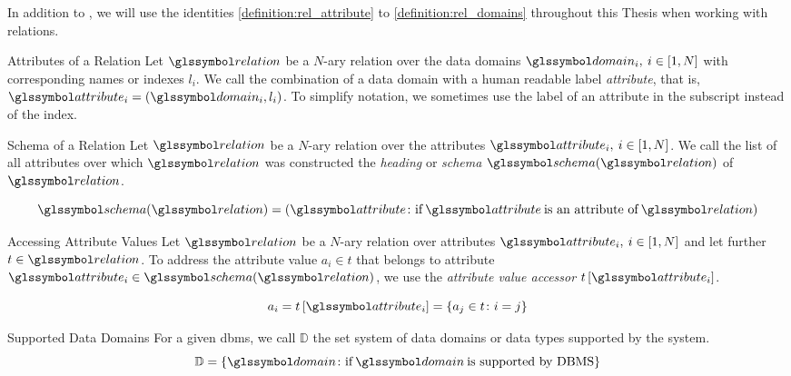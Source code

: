 In addition to , we will use the identities \ref{definition:rel_attribute} to \ref{definition:rel_domains} throughout this Thesis when working with relations.

\begin{definition}[label=definition:rel_attribute]{Attributes of a Relation}{}
    Let $\relation$ be a $N$-ary relation over the data domains $\domain_i, \: i \in \left[1, N \right]$ with corresponding names or indexes $l_i$. We call the combination of a data domain with a human readable label \emph{attribute}, that is, $\attribute_{i} = (\domain_i, l_i)$. To simplify notation, we sometimes use the label of an attribute in the subscript instead of the index.
\end{definition}

\begin{definition}[label=definition:rel_schema]{Schema of a Relation}{}
    Let $\relation$ be a $N$-ary relation over the attributes $\attribute_i, \: i \in \left[1, N \right]$. We call the list of all attributes over which $\relation$ was constructed the \emph{heading} or \emph{schema} $\schema (\relation)$ of $\relation$.

    \begin{equation*}
        \schema (\relation) = \left( \attribute \colon \textrm{if} \: \attribute \: \textrm{is an attribute of} \: \relation \right)
    \end{equation*}   
\end{definition}

\begin{definition}[label=definition:rel_attribute_value]{Accessing Attribute Values}{}
    Let $\relation$ be a $N$-ary relation over attributes $\attribute_i, \: i \in \left[1, N \right]$ and let further $t \in \relation$. To address the attribute value $a_i \in t$ that belongs to attribute $\attribute_i \in \schema(\relation) $, we use the \emph{attribute value accessor} $t\left[ \attribute_i \right]$.

    \begin{equation*}
        a_i = t\left[ \attribute_i \right] = \{ a_j \in t \colon i = j \}
    \end{equation*}  
\end{definition}

\begin{definition}[label=definition:rel_domains]{Supported Data Domains}{}
    For a given \acrshort{dbms}, we call $\mathbb{D}$ the set system of data domains or data types supported by the system.
    \begin{equation*}
        \mathbb{D} = \{ \domain \colon \textrm{if} \: \domain \: \textrm{is supported by DBMS} \}
    \end{equation*}
\end{definition}

